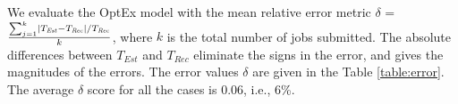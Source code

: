 \documentclass[conference]{IEEEtran}
\DeclarePairedDelimiter\abs{\lvert}{\rvert}\DeclarePairedDelimiterX\Set[2]{\lbrace}{\rbrace}{ #1 \,\delimsize|\,\mathopen{} #2 }
\begin{document}
\begin{table*}[!ht]
\caption{Confidence Interval of Estimation With Varying Choice of Representative Jobs for Each Job Category}
\label{table:confidence} \end{table*}
  We evaluate the OptEx model with the
 mean relative error metric \cite{leader2004numerical}
  $\delta$ = $\frac {\sum_{j=1}^{k} \abs{T_{\mathit{Est}} - T_{\mathit{Rec}}}/T_{\mathit{Rec}}} {k}$, where $k$ is the total number of jobs submitted. The absolute differences between
   $T_{\mathit{Est}}$ and $T_{\mathit{Rec}}$ eliminate the signs in the error, and gives the magnitudes of the errors. The error values $\delta$ are
given in the Table \ref{table:error}. The average $\delta$ score for all the cases is 0.06, i.e., 6\%. $\newcommand{\E}{\mathrm{E}}$
\end{document}
